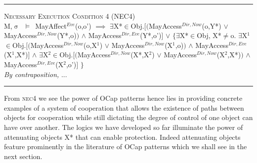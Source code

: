 \documentclass[a4paper,11pt, twoside,twocolumn]{article}
\newenvironment{logic}[1][null]
{\begin{flushleft} \small \label{#1}}
{\end{flushleft}}
\newcommand{\loin}{$\in$}
\newcommand{\loexists}{$\exists$}
\newcommand{\loand}{$\land$}
\newcommand{\loor} {$\lor$}
\newcommand{\loneq} {$\neq$}
\newcommand{\loimplies}{$\implies$}
\newcommand{\losigma}{$\upsigma$}
\newcommand{\loturns} {$\vDash$}
\newcommand{\ablock} {\null\qquad}
\begin{document}
\begin{logic}
\hrule\null
\textsc{\normalsize *Necessary Execution Condition 4 (NEC4)}\\
M,\losigma\ \loturns\ MayAffect$^{Eve}$(o,o') \loimplies\linebreak
\ablock \loexists X*\loin Obj.$[($MayAccess$^{Dir,Now}$(o,Y*) \loor \linebreak
\ablock \ablock \ablock \ablock MayAccess$^{Dir,Now}$(Y*,o)$)$\linebreak
\ablock \ablock \ablock \ablock \loand \linebreak
\ablock \ablock \ablock \ablock MayAccess$^{Dir,Eve}$(Y*,o')$]$\linebreak
\ablock \loor \linebreak
\ablock $\{$\loexists X*\loin Obj, X*\loneq o.\linebreak
\ablock \quad \loexists X$^1$\loin Obj.$[($MayAccess$^{Dir,Now}$(o,X$^1$) \loor \linebreak
\ablock \ablock \ablock \ablock MayAccess$^{Dir,Now}$(X$^1$,o)$)$\linebreak
\ablock \ablock \ablock \ablock \loand \linebreak
\ablock \ablock \ablock \ablock MayAccess$^{Dir,Eve}$(X$^1$,X*)$]$\linebreak
\ablock \quad \loand \linebreak
\ablock \quad \loexists X$^2$\loin Obj.$[($MayAccess$^{Dir,Now}$(X*,X$^2$) \loor \linebreak
\ablock \ablock \ablock \ablock MayAccess$^{Dir,Now}$(X$^2$,X*)$)$\linebreak
\ablock \ablock \ablock \ablock \loand \linebreak
\ablock \ablock \ablock \ablock MayAccess$^{Dir,Eve}$(X$^2$,o')$]$\linebreak
\ablock $\}$
	\linebreak\\
\textit{By contraposition,}\linebreak
...\linebreak
\\
\hrule
\end{logic}

From \textsc{nec4} we see the power of OCap patterns hence lies in providing concrete examples of a system of cooperation that allows the existence of paths between objects for cooperation while still dictating the degree of control of one object can have over another. The logics we have developed so far illuminate the power of attenuating objects X* that can enable protection. Indeed attenuating objects feature prominently in the literature of OCap patterns which we shall see in the next section.
\end{document}
